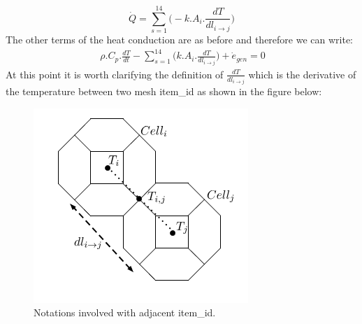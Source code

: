 \documentclass[11pt,letterpaper,titlepage]{article}
\begin{document}
\begin{equation*}
\dot{Q}=\sum_{s=1}^{14} \biggr( -k.A_i.\frac{dT}{dl_{i\to j}}\biggr)
\end{equation*}
\newline
The other terms of the heat conduction are as before and therefore we can write:
\newline
\begin{equation}
\begin{aligned}
 \ \rho.C_p. \frac{dT}{dt} - \sum_{s=1}^{14} \biggr( k.A_i.\frac{dT}{dl_{i\to j}}\biggr) + \dot{e}_{gen} =0
\end{aligned}
\label{equation:finVolHeatCon}
\end{equation}
\newline
At this point it is worth clarifying the definition of $\frac{dT}{dl_{i\to j}}$ which is the derivative of the temperature between two mesh item_id as shown in the figure below:
\begin{center}
	\begin{minipage}[c]{0.5\textwidth}
		\centering
		\begin{figure}[H]
		
			\includegraphics{AdjacentCells2.png}
			\caption{Notations involved with adjacent item_id.}
			\label{figure:Adjacentcells}
		\end{figure}
	\end{minipage}
\end{center}
\end{document}
